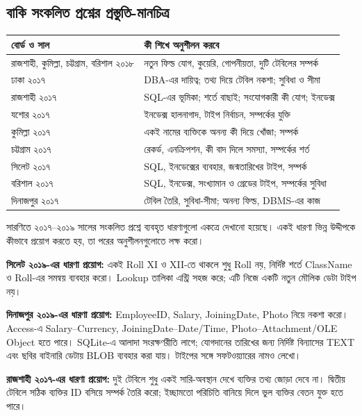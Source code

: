 \subsection{বাকি সংকলিত প্রশ্নের প্রস্তুতি-মানচিত্র}
\begin{flushleft}
\small
\begin{tabularx}{0.98\linewidth}{|p{30mm}|X|}\hline
বোর্ড ও সাল & কী শিখে অনুশীলন করবে\\ \hline
রাজশাহী, কুমিল্লা, চট্টগ্রাম, বরিশাল ২০১৮ & নতুন ফিল্ড যোগ, কুয়েরি, গোপনীয়তা, দুটি টেবিলের সম্পর্ক\\ \hline
ঢাকা ২০১৭ & DBA-এর দায়িত্ব; তথ্য দিয়ে টেবিল নকশা; সুবিধা ও সীমা\\ \hline
রাজশাহী ২০১৭ & SQL-এর ভূমিকা; শর্তে বাছাই; সংযোগকারী কী যোগ; ইনডেক্স\\ \hline
যশোর ২০১৭ & ইনডেক্স হালনাগাদ, টাইপ নির্বাচন, সম্পর্কের যুক্তি\\ \hline
কুমিল্লা ২০১৭ & একই নামের ব্যক্তিকে অনন্য কী দিয়ে খোঁজা; সম্পর্ক\\ \hline
চট্টগ্রাম ২০১৭ & রেকর্ড, এনক্রিপশন, কী বাদ দিলে সমস্যা, সম্পর্কের শর্ত\\ \hline
সিলেট ২০১৭ & SQL, ইনডেক্সের ব্যবহার, জন্মতারিখের টাইপ, সম্পর্ক\\ \hline
বরিশাল ২০১৭ & SQL, ইনডেক্স, সংখ্যামান ও গ্রেডের টাইপ, সম্পর্কের সুবিধা\\ \hline
দিনাজপুর ২০১৭ & টেবিল তৈরি, সুবিধা-সীমা; অনন্য ফিল্ড, DBMS-এর কাজ\\ \hline
\end{tabularx}
\end{flushleft}
সারণিতে ২০১৭--২০১৯ সালের সংকলিত প্রশ্নে ব্যবহৃত ধারণাগুলো একত্রে দেখানো হয়েছে। একই ধারণা ভিন্ন উদ্দীপকে কীভাবে প্রয়োগ করতে হয়, তা পরের অনুশীলনগুলোতে লক্ষ করো।

\textbf{সিলেট ২০১৯-এর ধারণা প্রয়োগ:} একই Roll XI ও XII-তে থাকলে শুধু Roll নয়, নির্দিষ্ট শর্তে ClassName ও Roll-এর সমন্বয় ব্যবহার করো। Lookup তালিকা এন্ট্রি সহজ করে; এটি নিজে একটি নতুন মৌলিক ডেটা টাইপ নয়।

\textbf{দিনাজপুর ২০১৯-এর ধারণা প্রয়োগ:} EmployeeID, Salary, JoiningDate, Photo নিয়ে নকশা করো। Access-এ Salary--Currency, JoiningDate--Date/Time, Photo--Attachment/OLE Object হতে পারে। SQLite-এ আলাদা সংরক্ষণরীতি লাগে; যোগদানের তারিখের জন্য নির্দিষ্ট বিন্যাসের TEXT এবং ছবির বাইনারি ডেটায় BLOB ব্যবহার করা যায়। টাইপের সঙ্গে সফটওয়্যারের নামও লেখো।

\textbf{রাজশাহী ২০১৭-এর ধারণা প্রয়োগ:} দুই টেবিলে শুধু একই সারি-অবস্থান দেখে ব্যক্তির তথ্য জোড়া দেবে না। দ্বিতীয় টেবিলে সঠিক ব্যক্তির ID বসিয়ে সম্পর্ক তৈরি করো; ইচ্ছামতো পরিচিতি বানিয়ে দিলে ভুল ব্যক্তির বেতন যুক্ত হতে পারে।


